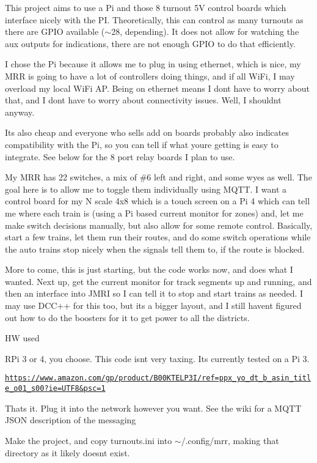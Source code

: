 This project aims to use a Pi and those 8 turnout 5V control boards which interface nicely with the PI. Theoretically, this can control as many turnouts as there are G\+P\+IO available ($\sim$28, depending). It does not allow for watching the aux outputs for indications, there are not enough G\+P\+IO to do that efficiently.

I chose the Pi because it allows me to plug in using ethernet, which is nice, my M\+RR is going to have a lot of controllers doing things, and if all Wi\+Fi, I may overload my local Wi\+Fi AP. Being on ethernet means I don\textquotesingle{}t have to worry about that, and I don\textquotesingle{}t have to worry about connectivity issues. Well, I shouldn\textquotesingle{}t anyway.

It\textquotesingle{}s also cheap and everyone who sells add on boards probably also indicates compatibility with the Pi, so you can tell if what you\textquotesingle{}re getting is easy to integrate. See below for the 8 port relay boards I plan to use.

My M\+RR has 22 switches, a mix of \#6 left and right, and some wyes as well. The goal here is to allow me to toggle them individually using M\+Q\+TT. I want a control board for my N scale 4x8 which is a touch screen on a Pi 4 which can tell me where each train is (using a Pi based current monitor for zones) and, let me make switch decisions manually, but also allow for some remote control. Basically, start a few trains, let them run their routes, and do some switch operations while the auto trains stop nicely when the signals tell them to, if the route is blocked.

More to come, this is just starting, but the code works now, and does what I wanted. Next up, get the current monitor for track segments up and running, and then an interface into J\+M\+RI so I can tell it to stop and start trains as needed. I may use D\+C\+C++ for this too, but it\textquotesingle{}s a bigger layout, and I still haven\textquotesingle{}t figured out how to do the boosters for it to get power to all the districts.

HW used


\begin{DoxyItemize}
\item R\+Pi 3 or 4, you choose. This code isn\textquotesingle{}t very taxing. It\textquotesingle{}s currently tested on a Pi 3.
\item \href{https://www.amazon.com/gp/product/B00KTELP3I/ref=ppx_yo_dt_b_asin_title_o01_s00?ie=UTF8&psc=1}{\tt https\+://www.\+amazon.\+com/gp/product/\+B00\+K\+T\+E\+L\+P3\+I/ref=ppx\+\_\+yo\+\_\+dt\+\_\+b\+\_\+asin\+\_\+title\+\_\+o01\+\_\+s00?ie=\+U\+T\+F8\&psc=1}
\end{DoxyItemize}

That\textquotesingle{}s it. Plug it into the network however you want. See the wiki for a M\+Q\+TT J\+S\+ON description of the messaging

Make the project, and copy turnouts.\+ini into $\sim$/.config/mrr, making that directory as it likely doesn\textquotesingle{}t exist. 